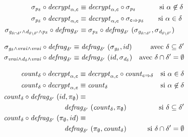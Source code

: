 \documentclass[french]{article}
\newcommand\ccPrj[1]{\pi_{\mathit{#1}}}
\newcommand\typeT[1]{\text{\ttfamily #1}}
\newcommand\ccSlt[1]{\sigma_{\mathit{#1}}}
\begin{document}
\begin{align}
	\ccSlt{p_{\delta}} \circ \decrypt{c}{\alpha} &\equiv
	\decrypt{c}{\alpha} \circ \ccSlt{p_{\delta}} \quad\qquad
	\text{ si $\alpha \not\in \delta$}
	\label{eq:law-sel-enc1}\\
	\ccSlt{p_{\delta}} \circ \decrypt{c}{\alpha} &\equiv
	\decrypt{c}{\alpha} \circ \ccSlt{\typeT{c} \Rightarrow p_{\delta}}\qquad
	\text{si $\alpha \in \delta$}
	\label{eq:law-sel-enc2}\\
	\ccSlt{g_{\delta \cap \delta'} \land
		d_{\delta \setminus \delta'} \land
		p_{\delta}} \circ \defrag{\delta'} &\equiv
	\ccSlt{p_\delta} \circ \defrag{\delta'}\ (
	\ccSlt{g_{\delta \cap \delta'}},
	\ccSlt{d_{\delta \setminus \delta'}}
	)\label{eq:law-sel-frag1}
\end{align}

\begin{align}
	\ccSlt{g_{\delta}
		\land vrai
		\land vrai} \circ \defrag{\delta'}
	&\equiv \defrag{\delta'}\ (\ccSlt{g_{\delta}}, id)
	&\text{avec $\delta \subseteq \delta'$}
	\label{eq:law-sel-frag2}\\
	\ccSlt{vrai
		\land d_{\delta}
		\land vrai} \circ \defrag{\delta'}
	&\equiv \defrag{\delta'}\ (id, \ccSlt{d_{\delta}})
	&\text{avec $\delta \cap \delta' = \emptyset$}
	\label{eq:law-sel-frag3}
\end{align}


\begin{align}
	\ccCount{\delta} \circ \decrypt{c}{\alpha}
	&\equiv \decrypt{c}{\alpha} \circ \ccCount{\typeT{c} \Rightarrow \delta}
	&\text{si $\alpha \in \delta$}
	\label{eq:law-cnt-enc1}\\
	\ccCount{\delta} \circ \decrypt{c}{\alpha}
	&\equiv \ccCount{\delta}
	&\text{si $\alpha \not\in \delta$}
	\label{eq:law-cnt-enc2}\\
	\ccCount{\delta} \circ \defrag{\delta'}\ (id, \ccPrj{\emptyset})
	&\equiv \nonumber\\
	&\kern -2em\defrag{\delta'}\ (\ccCount{\delta}, \ccPrj{\emptyset})
	&\kern -5em\text{si $\delta \subseteq \delta'$}
	\label{eq:law-cnt-frag1}\\
	\ccCount{\delta} \circ \defrag{\delta'}\ (\ccPrj{\emptyset}, id)
	&\equiv\nonumber\\
	&\kern -2em\defrag{\delta'}\ (\ccPrj{\emptyset}, \ccCount{\delta})
	&\kern -5em\text{si $\delta \cap \delta' = \emptyset$}
	\label{eq:law-cnt-frag2}
\end{align}
\end{document}

